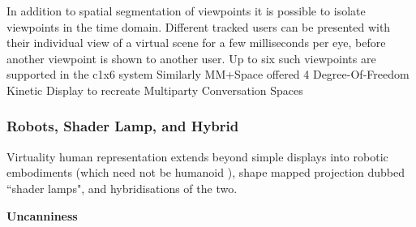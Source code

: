 In addition to spatial segmentation of viewpoints \cite{gotsch2018telehuman2} it is possible to isolate viewpoints in the time domain. Different tracked users can be presented with their individual view of a virtual scene for a few milliseconds per eye, before another viewpoint is shown to another user. Up to six such viewpoints are supported in the c1x6 system \cite{Kulik2011}
Similarly MM+Space offered 4 Degree-Of-Freedom Kinetic Display to recreate Multiparty Conversation Spaces \cite{Otsuka2013}
            \subsubsection{Robots, Shader Lamp, and Hybrid}
                Virtuality human representation extends beyond simple displays into robotic embodiments (which need not be humanoid \cite{Marti2005}), shape mapped projection dubbed ``shader lamps", and hybridisations of the two.\par 
                
				\textbf{Uncanniness}
				
